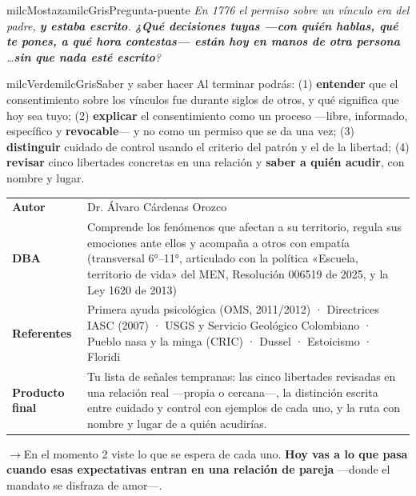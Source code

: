 \documentclass[11pt,letterpaper]{article}
\newcommand{\puente}[1]{%
  \begin{puentebox}%
    \textcolor{milcGradeDark}{$\rightarrow$}\hspace{2mm}#1%
  \end{puentebox}%
}
\begin{document}
\begin{softbox}{milcMostaza}{milcGris}{Pregunta-puente}
\textit{En 1776 el permiso sobre un vínculo era del padre, \textbf{y estaba escrito}. \textbf{¿Qué decisiones tuyas ---con quién hablas, qué te pones, a qué hora contestas--- están hoy en manos de otra persona} \ldots \textbf{sin que nada esté escrito}?}
\end{softbox}

\begin{softbox}{milcVerde}{milcGris}{Saber y saber hacer}
Al terminar podrás: (1) \textbf{entender} que el consentimiento sobre los vínculos fue durante siglos de otros, y qué significa que hoy sea tuyo; (2) \textbf{explicar} el consentimiento como un proceso ---libre, informado, específico y \textbf{revocable}--- y no como un permiso que se da una vez; (3) \textbf{distinguir} cuidado de control usando el criterio del patrón y el de la libertad; (4) \textbf{revisar} cinco libertades concretas en una relación y \textbf{saber a quién acudir}, con nombre y lugar.
\end{softbox}



\small
\begin{tabularx}{\textwidth}{>{\bfseries}p{3.0cm}Y}
Autor & Dr. Álvaro Cárdenas Orozco\\
DBA & Comprende los fenómenos que afectan a su territorio, regula sus emociones ante ellos y acompaña a otros con empatía (transversal 6°--11°, articulado con la política «Escuela, territorio de vida» del MEN, Resolución 006519 de 2025, y la Ley 1620 de 2013)\\
Referentes & Primera ayuda psicológica (OMS, 2011/2012) · Directrices IASC (2007) · USGS y Servicio Geológico Colombiano · Pueblo nasa y la minga (CRIC) · Dussel · Estoicismo · Floridi\\
Producto final & Tu lista de señales tempranas: las cinco libertades revisadas en una relación real —propia o cercana—, la distinción escrita entre cuidado y control con ejemplos de cada uno, y la ruta con nombre y lugar de a quién acudirías.\\
\end{tabularx}
\normalsize

\puente{En el momento 2 viste lo que se espera de cada uno. \textbf{Hoy vas a lo que pasa cuando esas expectativas entran en una relación de pareja} ---donde el mandato se disfraza de amor---.}
\end{document}
